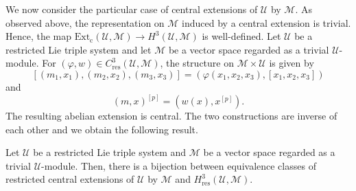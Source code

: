 \documentclass[11pt, twoside]{article}
\begin{document}
We now consider the particular case of central extensions of $\mathcal{U} $ by $\mathcal{M}$. As observed above, the representation on $\mathcal{M}$ induced by a central extension is trivial. Hence, the map $\mathrm{Ext_c}(\mathcal{U},\mathcal{M})\to H^3(\mathcal{U},\mathcal{M}) $ is well-defined. Let $\mathcal{U} $ be a restricted Lie triple system and let $\mathcal{M} $ be a vector space regarded as a trivial $\mathcal{U}$-module. For $(\varphi,w)\in C_\mathrm{res}^3(\mathcal{U},\mathcal{M}) $, the structure on $\mathcal{M}\times \mathcal{U} $ is given by $$[(m_1,x_1),(m_2,x_2),(m_3,x_3)]= (\varphi(x_1,x_2,x_3),[x_1,x_2,x_3]) $$ and $$(m,x)^{[p]}=(w(x),x^{[p]}). $$ The resulting abelian extension is central. The two constructions are inverse of each other and we obtain the following result.

\begin{thm}
     Let $\mathcal{U}$ be a restricted Lie triple system and $\mathcal{M}$ be a vector space regarded as a trivial $\mathcal{U}$-module. Then, there is a bijection between equivalence classes of restricted central extensions of $\mathcal{U}$ by $\mathcal{M}$ and $H^3_\mathrm{res}(\mathcal{U},\mathcal{M})$.
\end{thm}
\end{document}
